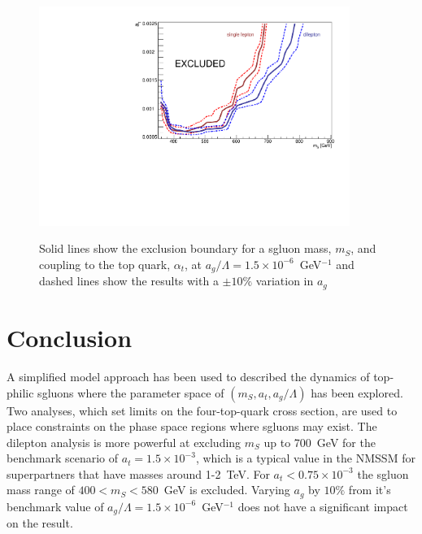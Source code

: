 \begin{figure}[h!]
\centering
    \includegraphics[width=0.9\textwidth]{images/Pheno/exclusion_agVariations.pdf}\\
    \caption{Solid lines show the exclusion boundary for a sgluon mass, $m_{S}$, and coupling to the top quark, $\alpha_{t}$, at $a_{g}/\Lambda = 1.5 \times 10^{-6}$~GeV$^{-1}$ and dashed lines show the results with a $\pm 10 \%$ variation in $a_{g}$}
    \label{fig:sgluonExclusion}
\end{figure}

\section{Conclusion \label{sec:sgluonConc}}

A simplified model approach has been used to described the dynamics of top-philic sgluons where the parameter space of $(m_{S}, a_{t}, a_{g}/\Lambda)$ has been explored. Two analyses, which set limits on the four-top-quark cross section, are used to place constraints on the phase space regions where sgluons may exist. The dilepton analysis is more powerful at excluding $m_{S}$ up to 700~GeV for the benchmark scenario of $a_{t}=1.5\times10^{-3}$, which is a typical value in the NMSSM for superpartners that have masses around 1-2~TeV. For $a_{t}<0.75\times10^{-3}$ the sgluon mass range of $400<m_{S}<580$~GeV is excluded. Varying $a_{g}$ by $10\%$ from it's benchmark value of $a_{g}/\Lambda = 1.5 \times 10^{-6}$~GeV$^{-1}$ does not have a significant impact on the result.